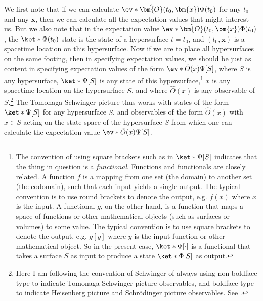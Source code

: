 \documentclass[12pt]{report}
\begin{document}
We first note that if we can calculate $\ev*{\hat{\bm{O}}(t_0,\bm{x})}{\Phi(t_0)}$ for any $t_0$ and any $\bm{x}$, then we can calculate all the expectation values that might interest us. But we also note that in the expectation value $\ev*{\hat{\bm{O}}(t_0,\bm{x})}{\Phi(t_0)}$,  the $\ket*{\Phi(t_0)}$-state is the state of a hypersurface $t=t_0$, and $(t_0,\bm{x})$ is a spacetime location on this hypersurface. Now if we are to place all hypersurfaces on the same footing, then in specifying expectation values, we should be just as content in specifying expectation values of the form $\ev*{\hat{O}(x)}{\Psi[S]}$, where $S$ is any hypersurface, $\ket*{\Psi[S]}$ %
% 
is any state of this hypersurface,\footnote{The convention of using square brackets such as in $\ket*{\Psi[S]}$ indicates that the thing in question is a \emph{functional}. Functions and functionals are closely related. A function $f$ is a mapping from one set (the domain) to another set (the codomain), such that each input yields a single output. The typical convention is to use round brackets to denote the output, e.g. $f(x)$ where $x$ is the input. A functional $g$, on the other hand, is a function that maps a space of functions or other mathematical objects (such as surfaces or volumes) to some value. The typical convention is to use square brackets to denote the output, e.g. $g[y]$ where $y$ is the input function or other mathematical object. So in the present case, $\ket*{\Phi[\cdot]}$ is a functional that takes a surface $S$ as input to produce a state $\ket*{\Phi[S]}$ as output.} $x$ is any spacetime location on the hypersurface $S$, and where $\hat{O}(x)$ %
%
 is any observable of $S$.\footnote{\label{boldref}Here I am following the convention of Schwinger of always using non-boldface type to indicate Tomonaga-Schwinger picture observables, and boldface type to indicate Heisenberg picture and Schr\"{o}dinger picture observables. See \cite[p. 1448]{SchwingerJulianI}.} The Tomonaga-Schwinger picture thus works with states of the form $\ket*{\Psi[S]}$ for any hypersurface $S$, and observables of the form $\hat{O}(x)$ with $x\in S$ acting on the state space of the hypersurface $S$ from which one can calculate the expectation value $\ev*{\hat{O}(x)}{\Psi[S]}$.
\end{document}
